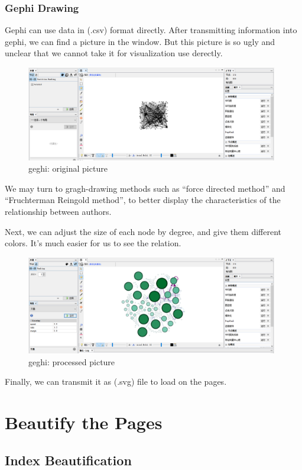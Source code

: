 \documentclass{book}
\begin{document}
\subsection{Gephi Drawing}

Gephi can use data in (.csv) format directly. After transmitting information into gephi, we can find a picture in the window. But this picture is so ugly and unclear that we cannot take it for visualization use derectly.  

\begin{figure}[H]
\centering
\includegraphics[width=11.0cm]{img/yhb_ge_1.png}
\caption{geghi: original picture}
\end{figure}
We may turn to gragh-drawing methods such as ``force directed method'' and ``Fruchterman Reingold method'', to better display the characteristics of the relationship between authors.

Next, we can adjust the  size of each node by degree, and give them different colors.
It's much easier for us to see the relation.
\begin{figure}[H]
\centering
\includegraphics[width=11.0cm]{img/yhb_ge_2.png}
\caption{geghi: processed picture}
\end{figure}
Finally, we can transmit it as (.svg) file to load on the pages.

\chapter {Beautify the Pages}

\section {Index Beautification}
\end{document}
